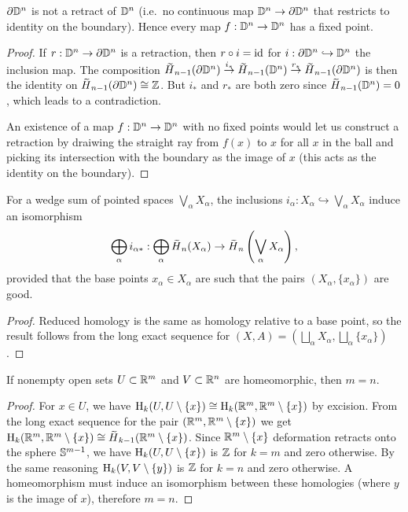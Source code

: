 \begin{cor}
    $\partial \mathbb{D}^n$ is not a retract of $\mathbb{D}^n$ (i.e.\ no continuous map $\mathbb{D}^n\to \partial \mathbb{D}^n$ that restricts to identity on the boundary). Hence every map $f:\mathbb{D}^n\to \mathbb{D}^n$ has a fixed point.
\end{cor}
\begin{proof}
     If $r:\mathbb{D}^n\to \partial \mathbb{D}^n$ is a retraction, then $r\circ i=\operatorname{id}$ for $i:\partial \mathbb{D}^n\hookrightarrow \mathbb{D}^n$ the inclusion map. The composition $\wt{H}_{n-1}(\partial \bbD^n)\overset{i_\ast}\to \wt{H}_{n-1}(\bbD^n)\overset{r_\ast}\to \wt{H}_{n-1}(\partial \bbD^n)$ is then the identity on $\wt{H}_{n-1}(\partial \bbD^n)\cong \bbZ$. But $i_\ast$ and $r_\ast$ are both zero since $\wt{H}_{n-1}(\bbD^n)=0$, which leads to a contradiction.
     
     An existence of a map $f:\mathbb{D}^n\to \mathbb{D}^n$ with no fixed points would let us construct a retraction by draiwing the straight ray from $f(x)$ to $x$ for all $x$ in the ball and picking its intersection with the boundary as the image of $x$ (this acts as the identity on the boundary).
\end{proof}



\begin{cor}
    For a wedge sum of pointed spaces $\bigvee_{\alpha}X_\alpha$, the inclusions $i_\alpha:X_\alpha\hookrightarrow \bigvee_{\alpha}X_\alpha$ induce an isomorphism 
    \[\bigoplus_\alpha i_{\alpha\ast}:\bigoplus_\alpha\wt{H}_n(X_\alpha)\to \wt{H}_n\left(\bigvee_{\alpha}X_\alpha\right),\]
    provided that the base points $x_\alpha\in X_\alpha$ are such that the pairs $(X_\alpha,\{x_\alpha\})$ are good.
\end{cor}
\begin{proof}
     Reduced homology is the same as homology relative to a base point, so the result follows from the long exact sequence for $(X,A)=\left(\bigsqcup_\alpha X_\alpha, \bigsqcup_\alpha \{x_\alpha\}\right)$.
\end{proof}

\begin{cor}
    If nonempty open sets $U\subset \mathbb{R}^m$ and $V\subset \mathbb{R}^n$ are homeomorphic, then $m=n$.
\end{cor}
\begin{proof}
     For $x\in U$, we have $\mathrm{H}_k(U,U\setminus \{x\})\cong \mathrm{H}_k(\mathbb{R}^m,\mathbb{R}^m\setminus \{x\})$ by excision. From the long exact sequence for the pair $(\mathbb{R}^m,\mathbb{R}^m\setminus\{x\})$ we get $\rmH_k(\bbR^m,\bbR^m\setminus\{x\})\cong \wt{H}_{k-1}(\bbR^m\setminus\{x\})$. Since $\mathbb{R}^m\setminus\{x\}$ deformation retracts onto the sphere $\mathbb{S}^{m-1}$, we have $\mathrm{H}_k(U,U\setminus\{x\})$ is $\mathbb{Z}$ for $k=m$ and zero otherwise. By the same reasoning $\mathrm{H}_k(V,V\setminus\{y\})$ is $\mathbb{Z}$ for $k=n$ and zero otherwise. A homeomorphism must induce an isomorphism between these homologies (where $y$ is the image of $x$), therefore $m=n$.
\end{proof}





